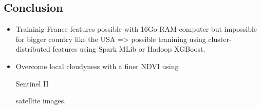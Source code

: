 \documentclass[c]{beamer}
\begin{document}
\subsection{Conclusion}
\begin{frame}
 \begin{itemize}
  \item Traininig France features possible with 16Go-RAM computer but impossible for bigger country like the USA => possible tranining using cluster-distributed features using Spark MLib or Hadoop XGBoost. 
  \item Overcome local cloudyness with a finer NDVI using \begin{itshape}Sentinel II\end{itshape} satellite images.
 \end{itemize}

\end{frame}
\end{document}
